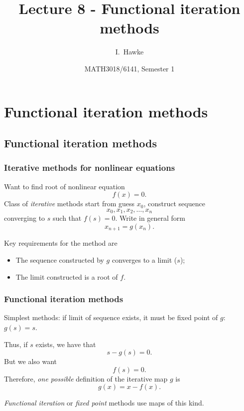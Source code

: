 \documentclass{beamer}
\title[Lecture 8] %
{Lecture 8 - Functional iteration methods}
\author[I. Hawke] %
{I.~Hawke}
\institute[University of Southampton] %
{
  School of Mathematics, \\
  University of Southampton, UK
}
\date[Semester 1] %
{MATH3018/6141, Semester 1}
\begin{document}
\begin{frame}
  \titlepage
\end{frame}


\section{Functional iteration methods}

\subsection{Functional iteration methods}

\begin{frame}
  \frametitle{Iterative methods for nonlinear equations}

  Want to find root of nonlinear equation
  \begin{equation*}
    f(x) = 0. %
  \end{equation*}
  Class of  \emph{iterative} methods start from guess $x_0$, construct sequence
  \begin{equation*}
    x_0, x_1, x_2, \dots, x_n
  \end{equation*}
  converging to $s$ such that $f(s) = 0$. \pause Write in general form
  \begin{equation*}
    x_{n+1} = g(x_n).
  \end{equation*} \pause

  Key requirements for the method are
  \begin{itemize}
  \item The sequence constructed by $g$ converges to a limit ($s$);
    \pause
  \item The limit constructed is a root of $f$.
  \end{itemize}


\end{frame}

\begin{frame}
  \frametitle{Functional iteration methods}

  Simplest methods: if limit of sequence exists, it must be fixed point of $g$: $g(s) = s$. \pause

  \vspace{1ex}

  Thus, if $s$ exists, we have that
  \begin{equation*}
    s - g(s) = 0.
  \end{equation*}
  But we also want
  \begin{equation*}
    f(s) = 0.
  \end{equation*} \pause
  Therefore, \emph{one possible} definition of the iterative map $g$ is
  \begin{equation*}
    g(x) = x - f(x).
  \end{equation*}

  \emph{Functional iteration} or \emph{fixed point} methods use maps of this kind.

\end{frame}
\end{document}
